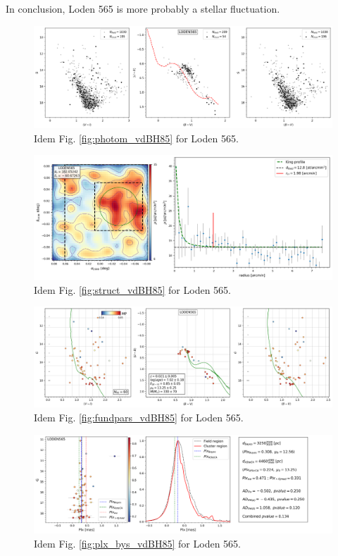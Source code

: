 \documentclass[draft]{aa}
\begin{document}
In conclusion, Loden 565 is more probably a stellar fluctuation.

\begin{figure}[ht]
    \centering
    \includegraphics[width=\hsize]{../figs/obs_LODEN565.png}
    \caption{Idem Fig. \ref{fig:photom_vdBH85} for Loden 565.}
    \label{fig55}
\end{figure}
\begin{figure}[ht]
    \centering
    \includegraphics[width=\hsize]{../figs/dmap_loden565.png}
    \caption{Idem Fig. \ref{fig:struct_vdBH85} for Loden 565.}
    \label{fig56}
\end{figure}
\begin{figure}[ht]
    \centering
    \includegraphics[width=\hsize]{../figs/cmds_loden565.png}
    \caption{Idem Fig. \ref{fig:fundpars_vdBH85} for Loden 565.}
    \label{fig57}
\end{figure}
\begin{figure}[ht]
    \centering
    \includegraphics[width=\hsize]{../figs/plx_LODEN565.png}
    \caption{Idem Fig. \ref{fig:plx_bys_vdBH85} for Loden 565.}
    \label{fig58}
\end{figure}
\end{document}
